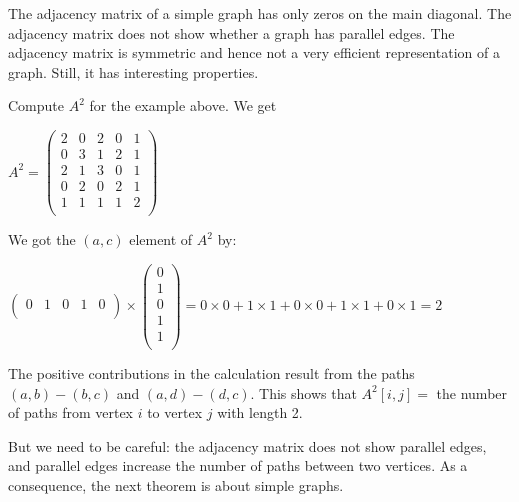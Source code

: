 The adjacency matrix of a simple graph has only zeros on the main
diagonal. The adjacency matrix does not show whether a graph has
parallel edges. The adjacency matrix is symmetric and hence not a
very efficient representation of a graph. Still, it has interesting
properties.

\begin{example}
Compute $A^{2}$ for the example above. We get

\begin{center}
$
A^{2} = \left(
\begin{array}{ccccc}
2 & 0 & 2 & 0 & 1\\
0 & 3 & 1 & 2 & 1\\
2 & 1 & 3 & 0 & 1\\
0 & 2 & 0 & 2 & 1\\
1 & 1 & 1 & 1 & 2\\
\end{array}
\right)
$
\end{center}

We got the $(a,c)$ element of $A^{2}$ by:

\begin{center}
$
\left(
\begin{array}{ccccc}
0 & 1 & 0 & 1 & 0\\
\end{array}
\right)
\times
\left(
\begin{array}{c}
0\\
1\\
0\\
1\\
1\\
\end{array}
\right)
 =
0\times 0 + 1\times 1 + 0\times 0 + 1\times 1 + 0\times 1 = 2$
\end{center}

The positive contributions in the calculation result from the paths
$(a,b)-(b,c)$ and $(a,d)-(d,c)$. This shows that $A^{2}[i,j] = $ the
number of paths from vertex $i$ to vertex $j$ with length 2.
\end{example}
But we need to
be careful: the adjacency matrix does not show parallel edges, and
parallel edges increase the number of paths between two vertices.
As a consequence, the next theorem is about simple graphs.

